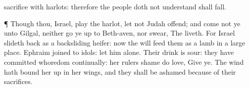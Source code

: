 {sacrifice with
harlots: therefore the
people
{} doth not
understand shall
fall.
\par }{\PP {}¶ Though thou,
Israel, play the
harlot,
{} let not
Judah
offend; and
come not ye unto
Gilgal, neither go ye
up to
Beth-aven, nor
swear, The
{}
liveth.
For
Israel slideth
back as a
backsliding
heifer: now the
{} will
feed them as a
lamb in a large
place.
Ephraim
{}
joined to
idols: let him
alone.
Their
drink is
sour: they have committed
whoredom
continually: her
rulers
{}
shame do
love,
Give ye.
The
wind hath bound her
up in her
wings, and they shall be
ashamed because of their
sacrifices.

}
